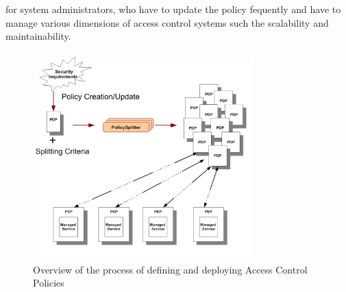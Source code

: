 for system administrators, who have to update the policy fequently and have to manage various dimensions of access control 
systems such the scalability and maintainability.
\begin{figure}[!h]
\begin{center}
\includegraphics[width=8.5cm, height=8cm]{Overall-process}

\caption{Overview of the process of defining and deploying Access Control Policies}

\label{overallprocess}

\end{center}

\end{figure} 